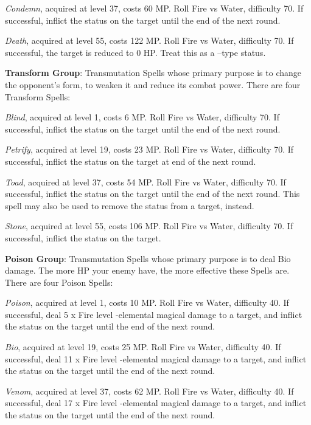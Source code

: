 \begin{multicols}{2}
    \textit{Condemn}, acquired at level 37, costs 60 MP. Roll Fire vs Water, difficulty 70. If successful, inflict the  status on the target until the end of the next round.
    
    \textit{Death}, acquired at level 55, costs 122 MP. Roll Fire vs Water, difficulty 70. If successful, the target is reduced to 0 HP. Treat this as a –type status.
    
    \textbf{Transform Group}: Transmutation Spells whose primary purpose is to change the opponent’s form, to weaken it and reduce its combat power. There are four Transform Spells:
    
    \textit{Blind}, acquired at level 1, costs 6 MP. Roll Fire vs Water, difficulty 70. If successful, inflict the  status on the target until the end of the next round.
    
    \textit{Petrify}, acquired at level 19, costs 23 MP. Roll Fire vs Water, difficulty 70. If successful, inflict the  status on the target at end of the next round.
    
    \textit{Toad}, acquired at level 37, costs 54 MP. Roll Fire vs Water, difficulty 70. If successful, inflict the  status on the target until the end of the next round. This spell may also be used to remove the  status from a target, instead.
    
    \textit{Stone}, acquired at level 55, costs 106 MP. Roll Fire vs Water, difficulty 70. If successful, inflict the  status on the target.
    
    \textbf{Poison Group}: Transmutation Spells whose primary purpose is to deal Bio damage. The more HP your enemy have, the more effective these Spells are. There are four Poison Spells:
    
    \textit{Poison}, acquired at level 1, costs 10 MP. Roll Fire vs Water, difficulty 40. If successful, deal 5 x Fire level -elemental magical damage to a target, and inflict the  status on the target until the end of the next round.
    
    \textit{Bio}, acquired at level 19, costs 25 MP. Roll Fire vs Water, difficulty 40. If successful, deal 11 x Fire level -elemental magical damage to a target, and inflict the  status on the target until the end of the next round.
    
    \textit{Venom}, acquired at level 37, costs 62 MP. Roll Fire vs Water, difficulty 40. If successful, deal 17 x Fire level -elemental magical damage to a target, and inflict the  status on the target until the end of the next round.
    

\end{multicols}
